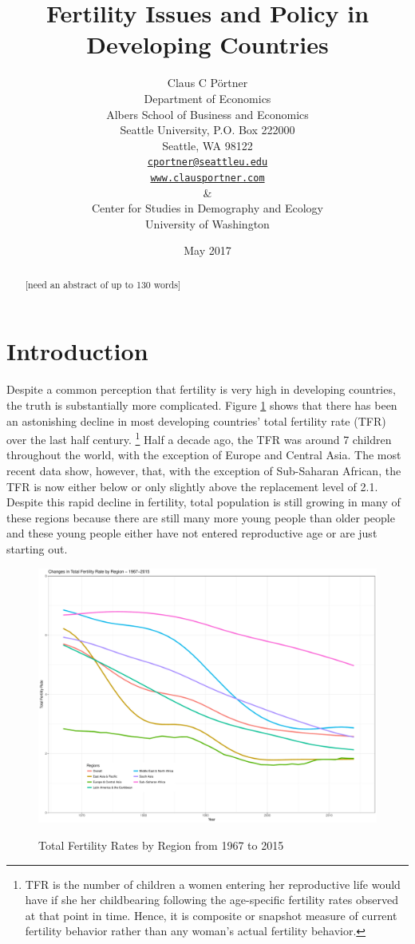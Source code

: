 \documentclass[letterpaper,12pt]{article}
\title{Fertility Issues and Policy in Developing Countries}
\author{Claus C P\"ortner\\
    Department of Economics\\
    Albers School of Business and Economics\\
    Seattle University, P.O. Box 222000\\
    Seattle, WA 98122\\
    \href{mailto:cportner@seattleu.edu}{\texttt{cportner@seattleu.edu}}\\
    \href{http://www.clausportner.com}{\texttt{www.clausportner.com}}\\
    \& \\
    Center for Studies in Demography and Ecology \\
    University of Washington\\ \vspace{2cm}
    }
\date{May 2017}
\begin{document}
\maketitle
\thispagestyle{empty}

\begin{abstract}
[need an abstract of up to 130 words]
\end{abstract}

\newpage 

\doublespacing

\section{Introduction}

Despite a common perception that fertility is very high in developing
countries, the truth is substantially more complicated.
Figure \ref{fig:TFR} shows that there has been an astonishing decline in
most developing countries' total fertility rate (TFR) over the last half
century.%
\footnote{
TFR is the number of children a women entering her reproductive life
would have if she her childbearing following the age-specific fertility
rates observed at that point in time.
Hence, it is composite or snapshot measure of current fertility
behavior rather than any woman's actual fertility behavior.}
Half a decade ago, the TFR was around 7 children throughout the world,
with the exception of Europe and Central Asia.
The most recent data show, however, that, with the exception of
Sub-Saharan African, the TFR is now either below or only slightly above
the replacement level of 2.1.
Despite this rapid decline in fertility, total population is still
growing in many of these regions because there are still many more young
people than older people and these young people either have not entered
reproductive age or are just starting out.

\begin{figure}[hp]
    \centering
    \caption{Total Fertility Rates by Region from 1967 to 2015}
    \includegraphics[width=0.75\linewidth]{../figures/totalFertilityRates.pdf}
    \label{fig:TFR}
\end{figure}
\end{document}
